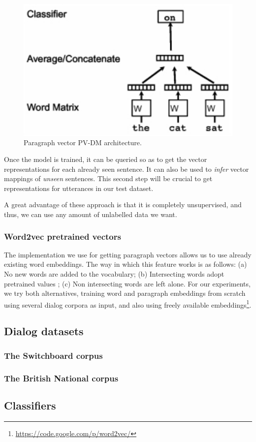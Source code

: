 \begin{figure}
\centering
\begin{minipage}{.3\textwidth}
\includegraphics[width=1\textwidth]{img/par2vec_arq}
\caption{Paragraph vector PV-DM architecture.}
\label{fig:p2v_arq}
\end{minipage}
\end{figure}

Once the model is trained, it can be queried so as to get the vector representations for each already seen sentence. It can also be used to \emph{infer} vector mappings of \emph{unseen} sentences. This second step will be crucial to get representations for utterances in our test dataset.

A great advantage of these approach is that it is completely unsupervised, and thus, we can use any amount of unlabelled data we want.

\subsubsection*{Word2vec pretrained vectors}
The implementation we use for getting paragraph vectors allows us to use already existing word embeddings. The way in which this feature works is as follows: (a) No new words are added to the vocabulary; (b) Intersecting words adopt pretrained values ; (c) Non intersecting words are left alone.
For our experiments, we try both alternatives, training word and paragraph embeddings from scratch using several dialog corpora as input, and also using freely available embeddings\footnote{\url{https://code.google.com/p/word2vec/}}.

\subsection{Dialog datasets}

\subsubsection*{The Switchboard corpus}

\subsubsection*{The British National corpus}

\subsection{Classifiers}
